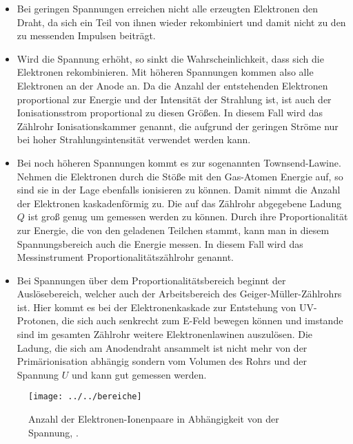 \begin{itemize}
	\item Bei geringen Spannungen erreichen nicht alle erzeugten Elektronen den Draht, da sich ein Teil von ihnen wieder rekombiniert und damit nicht zu den zu messenden Impulsen beiträgt.
	\item Wird die Spannung erhöht, so sinkt die Wahrscheinlichkeit, dass sich die Elektronen rekombinieren. Mit höheren Spannungen kommen also alle Elektronen an der Anode an. Da die Anzahl der entstehenden Elektronen proportional zur Energie und der 
	Intensität der Strahlung ist, ist auch der Ionisationsstrom proportional zu diesen Größen. In diesem Fall wird das Zählrohr Ionisationskammer genannt, die aufgrund der geringen Ströme nur bei hoher Strahlungsintensität verwendet werden kann.
	\item Bei noch höheren Spannungen kommt es zur sogenannten Townsend-Lawine. Nehmen die Elektronen durch die Stöße mit den Gas-Atomen Energie auf, so sind sie in der Lage ebenfalls ionisieren zu können. Damit nimmt die Anzahl der Elektronen 
	kaskadenförmig zu. Die auf das Zählrohr abgegebene Ladung $Q$ ist groß genug um gemessen werden zu können. Durch ihre Proportionalität zur Energie, die von den geladenen Teilchen stammt, kann man in diesem Spannungsbereich auch die Energie messen.
	In diesem Fall wird das Messinstrument Proportionalitätszählrohr genannt.
	\item Bei Spannungen über dem Proportionalitätsbereich beginnt der Auslösebereich, welcher auch der Arbeitsbereich des Geiger-Müller-Zählrohrs ist. Hier kommt es bei der Elektronenkaskade zur Entstehung von UV-Protonen, die sich auch senkrecht zum 
	E-Feld bewegen können und imstande sind im gesamten Zählrohr weitere Elektronenlawinen auszulösen. Die Ladung, die sich am Anodendraht ansammelt ist nicht mehr von der Primärionisation abhängig sondern vom Volumen des Rohrs und der Spannung $U$ und
	kann gut gemessen werden.
	
\end{itemize}

\begin{figure}[h!tbp]
	\centering
	\texttt{[image: ../../bereiche]}
	\caption{Anzahl der Elektronen-Ionenpaare in Abhängigkeit von der Spannung, \cite[2]{anleitung703}.}
	\label{fig:bereiche}
\end{figure}

